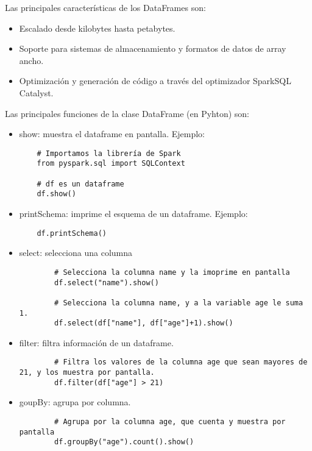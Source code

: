 \documentclass[12pt,a4paper,twoside,openright,titlepage,final]{article}
\begin{document}
Las principales características de los DataFrames son:

\begin{itemize}
	\item Escalado desde kilobytes hasta petabytes.
	\item Soporte para sistemas de almacenamiento y formatos de datos de array ancho.
	\item Optimización y generación de código a través del optimizador SparkSQL Catalyst. 
\end{itemize} 

Las principales funciones de la clase DataFrame (en Pyhton) son:

\begin{itemize}
	
	\item show: muestra el dataframe en pantalla. Ejemplo:
	
	\begin{verbatim}
	# Importamos la librería de Spark
	from pyspark.sql import SQLContext
	
	# df es un dataframe
	df.show()
	\end{verbatim}
	
	\item printSchema: imprime el esquema de un dataframe. Ejemplo:
	
	\begin{verbatim}
	df.printSchema()
	\end{verbatim}
	
	\item select: selecciona una columna
	
	\begin{verbatim}
		# Selecciona la columna name y la imoprime en pantalla
		df.select("name").show()
		
		# Selecciona la columna name, y a la variable age le suma 1.
		df.select(df["name"], df["age"]+1).show()
	\end{verbatim}
	
	\item filter: filtra información de un dataframe.
	
	\begin{verbatim}
		# Filtra los valores de la columna age que sean mayores de 21, y los muestra por pantalla.
		df.filter(df["age"] > 21)
	\end{verbatim}
	
	\item goupBy: agrupa por columna.
	
	\begin{verbatim}
		# Agrupa por la columna age, que cuenta y muestra por pantalla
		df.groupBy("age").count().show()
	\end{verbatim}
\end{itemize}
\end{document}
